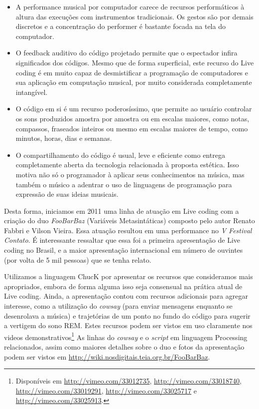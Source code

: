 \begin{itemize}
    \item A performance musical por computador carece de recursos
      performáticos à altura das execuções com instrumentos
      tradicionais. Os gestos são por demais discretos e a
      concentração do performer é bastante focada na tela do
      computador.
    \item O feedback auditivo do código projetado permite que o
      espectador infira significados dos códigos. Mesmo que de forma
      superficial, este recurso do Live coding é em muito capaz de
      desmistificar a programação de computadores e sua aplicação em
      computação musical, por muito considerada completamente
      intangível.
    \item O código em si é um recurso poderosíssimo, que permite ao
      usuário controlar os sons produzidos amostra por amostra ou em
      escalas maiores, como notas, compassos, fraseados inteiros ou
      mesmo em escalas maiores de tempo, como minutos, horas, dias e
      semanas.
    \item O compartilhamento do código é usual, leve e eficiente como
      entrega completamente aberta da tecnologia relacionada à
      proposta estética. Isso motiva não só o programador à aplicar
      seus conhecimentos na música, mas também o músico a adentrar o
      uso de linguagens de programação para expressão de suas ideias
      musicais.
\end{itemize}

Desta forma, iniciamos em 2011 uma linha de atuação em Live coding com
a criação do duo \emph{FooBarBaz} (Variáveis Metasintáticas) composto
pelo autor Renato Fabbri e Vilson Vieira. Essa atuação resultou em uma
performance no \emph{V Festival Contato}. É interessante ressaltar que
essa foi a primeira apresentação de Live coding no Brasil, e a maior
apresentação internacional em número de ouvintes (por volta de 5 mil
pessoas) que se tenha relato.

Utilizamos a linguagem ChucK por apresentar os recursos que
consideramos mais apropriados, embora de forma alguma isso seja
consensual na prática atual de Live coding. Ainda, a apresentação
contou com recursos adicionais para agregar interesse, como a
utilização do \emph{cowsay} (para enviar mensagens enquanto se
desenrolava a música) e trajetórias de um ponto no fundo do código
para sugerir a vertigem do sono REM. Estes recursos podem ser vistos
em uso claramente nos videos demonstrativos\footnote{Disponíveis em
  \url{http://vimeo.com/33012735}, \url{http://vimeo.com/33018740},
  \url{http://vimeo.com/33019291}, \url{http://vimeo.com/33025717} e
  \url{http://vimeo.com/33025913}.}  As linhas do \emph{cowsay} e o
\emph{script} em linguagem Processing relacionados, assim como maiores
detalhes sobre o duo e fotos da apresentação podem ser vistos em
\url{http://wiki.nosdigitais.teia.org.br/FooBarBaz}.

